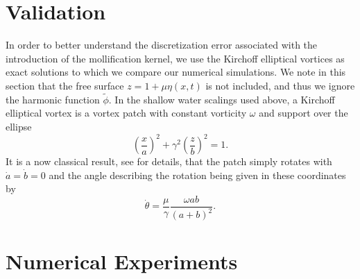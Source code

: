 \documentclass[a4paper,11pt]{article}
\begin{document}
\section*{Validation}
In order to better understand the discretization error associated with the introduction of the mollification kernel, we use the Kirchoff elliptical vortices \cite{mitchell,crosby} as exact solutions to which we compare our numerical simulations.  We note in this section that the free surface $z=1+\mu\eta(x,t)$ is not included, and thus we ignore the harmonic function $\tilde{\phi}$.  In the shallow water scalings used above, a Kirchoff elliptical vortex is a vortex patch with constant vorticity $\omega$ and support over the ellipse
\[
\left(\frac{x}{a}\right)^{2} + \gamma^{2}\left(\frac{z}{b} \right)^{2} = 1.
\]
It is a now classical result, see \cite{mitchell} for details, that the patch simply rotates with $\dot{a}=\dot{b}=0$ and the angle describing the rotation being given in these coordinates by 
\[
\dot{\theta} = \frac{\mu}{\gamma} \frac{\omega ab}{(a+b)^{2}}.
\]

\section*{Numerical Experiments}



\end{document}
